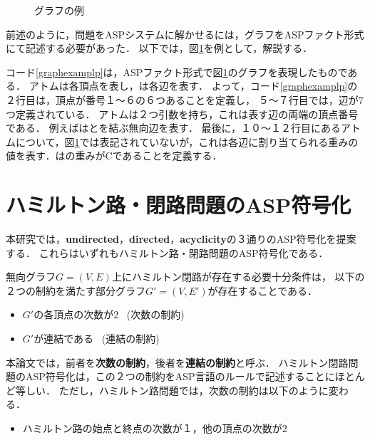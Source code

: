 \begin{figure}[tbp]
\begin{center}

\caption{グラフの例}
\label{graphexample}
\end{center}
\end{figure}
前述のように，問題をASPシステムに解かせるには，グラフをASPファクト形式にて記述する必要があった．
以下では，図\ref{graphexample}を例として，解説する．

コード\ref{graphexamplp}は，ASPファクト形式で図\ref{graphexample}のグラフを表現したものである．
アトムは各頂点を表し，は各辺を表す．
よって，コード\ref{graphexamplp}の２行目は，頂点が番号１〜６の６つあることを定義し，
５〜７行目では，辺が7つ定義されている．
アトムは２つ引数を持ち，これは表す辺の両端の頂点番号である．
例えばはとを結ぶ無向辺を表す．
最後に，１０〜１２行目にあるアトムについて，図\ref{graphexample}では表記されていないが，これは各辺に割り当てられる重みの値を表す．はの重みがCであることを定義する．
\section{ハミルトン路・閉路問題のASP符号化}\label{hamiltonianasp}
本研究では，\textbf{undirected}，\textbf{directed}，\textbf{acyclicity}の３通りのASP符号化を提案する．
これらはいずれもハミルトン路・閉路問題のASP符号化である．

無向グラフ$G=(V,E)$上にハミルトン閉路が存在する必要十分条件は，
以下の２つの制約を満たす部分グラフ$G'=(V,E')$が存在することである．\\
\begin{itemize}
\item $G'$の各頂点の次数が2 \ (次数の制約)\\
\item $G'$が連結である \ (連結の制約)\\
\end{itemize}
本論文では，前者を\textbf{次数の制約}，後者を\textbf{連結の制約}と呼ぶ．
ハミルトン閉路問題のASP符号化は，この２つの制約をASP言語のルールで記述することにほとんど等しい．
ただし，ハミルトン路問題では，次数の制約は以下のように変わる．\\
\begin{itemize}
\item ハミルトン路の始点と終点の次数が１，他の頂点の次数が2\\
\end{itemize}

